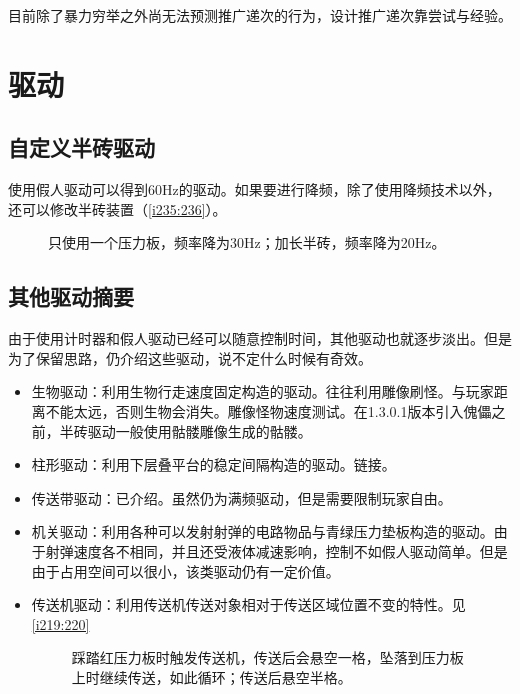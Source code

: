 目前除了暴力穷举之外尚无法预测推广递次的行为，设计推广递次靠尝试与经验。

\section{驱动}

\subsection{自定义半砖驱动}
使用假人驱动可以得到60Hz的驱动。如果要进行降频，除了使用降频技术以外，还可以修改半砖装置（\autoref{i235:236}）。

\begin{figure}[!ht]
\begin{center}
%
%
\end{center}
\caption{\protect{}只使用一个压力板，频率降为30Hz；\protect{}加长半砖，频率降为20Hz。}
\label{i235:236}
\end{figure}

\subsection{其他驱动摘要}
由于使用计时器和假人驱动已经可以随意控制时间，其他驱动也就逐步淡出。但是为了保留思路，仍介绍这些驱动，说不定什么时候有奇效。
\begin{itemize}
\item 生物驱动：利用生物行走速度固定构造的驱动。往往利用雕像刷怪。与玩家距离不能太远，否则生物会消失。雕像怪物速度测试。在1.3.0.1版本引入傀儡之前，半砖驱动一般使用骷髅雕像生成的骷髅。
\item 柱形驱动：利用下层叠平台的稳定间隔构造的驱动。链接。
\item 传送带驱动：已介绍。虽然仍为满频驱动，但是需要限制玩家自由。
\item 机关驱动：利用各种可以发射射弹的电路物品与青绿压力垫板构造的驱动。由于射弹速度各不相同，并且还受液体减速影响，控制不如假人驱动简单。但是由于占用空间可以很小，该类驱动仍有一定价值。
\item 传送机驱动：利用传送机传送对象相对于传送区域位置不变的特性。见\autoref{i219:220}

\begin{figure}[!ht]
\begin{center}
%
%
\end{center}
\caption{\protect{}踩踏红压力板时触发传送机，传送后会悬空一格，坠落到压力板上时继续传送，如此循环；\protect{}传送后悬空半格。}
\label{i219:220}
\end{figure}

\end{itemize}

